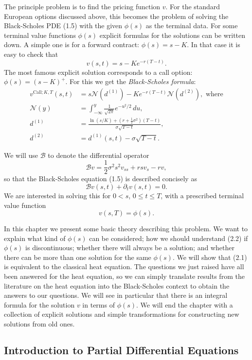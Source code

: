The principle problem is to find the pricing function $v$. For the standard European options discussed above, this becomes the problem of solving the Black-Scholes PDE (1.5) with the given $\phi(s)$ as the terminal data. For some terminal value functions $\phi(s)$ explicit formulas for the solutions can be written down. A simple one is for a forward contract: $\phi(s)=s-K.$ In that case it is easy to check that
\begin{equation*}
v(s,t)=s-Ke^{-r(T-t)}.
\end{equation*}
The most famous explicit solution corresponds to a call option: $\phi(s)=(s-K)^{+}$. For this we get the \textit{Black-Scholes formula}:
\begin{align*}
v^{\text{Call};K,T}(s,t)&=s\mathcal{N}(d^{(1)})-Ke^{-r(T-t)}\mathcal{N}(d^{(2)}),\text{ where}\\
\mathcal{N}(y)&=\int_{-\infty}^{y}\frac{1}{\sqrt{2\pi}}e^{-u^{2}/2}\, du,\\
d^{(1)}&=\frac{\ln(s/K)+(r+\frac{1}{2}\sigma^{2})(T-t)}{\sigma\sqrt{T-t}},\\
d^{(2)}&=d^{(1)}(s,t)-\sigma\sqrt{T-t}.
\end{align*}

We will use \(\mathcal{B}\) to denote the differential operator
\[
\mathcal{B}v = \frac{1}{2}\sigma^2 s^2 v_{ss} + r s v_s - r v,
\]
so that the Black-Scholes equation (1.5) is described concisely as
\[
\mathcal{B}v(s,t) + \partial_t v(s,t) = 0. \tag{2.1}
\]
We are interested in solving this for \(0 < s\), \(0 \leq t \leq T\), with a prescribed terminal value function
\[
v(s,T) = \phi(s). \tag{2.2}
\]

In this chapter we present some basic theory describing this problem. We want to explain what kind of \(\phi(s)\) can be considered; how we should understand (2.2) if \(\phi(s)\) is discontinuous; whether there will always be a solution; and whether there can be more than one solution for the same \(\phi(s)\). We will show that (2.1) is equivalent to the classical heat equation. The questions we just raised have all been answered for the heat equation, so we can simply translate results from the literature on the heat equation into the Black-Scholes context to obtain the answers to our questions. We will see in particular that there is an integral formula for the solution \(v\) in terms of \(\phi(s)\). We will end the chapter with a collection of explicit solutions and simple transformations for constructing new solutions from old ones.

\subsection{Introduction to Partial Differential Equations}

